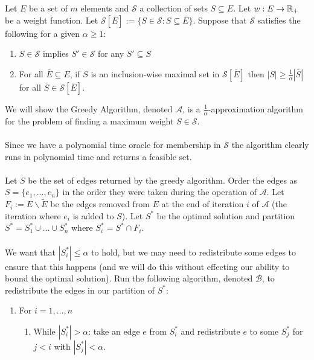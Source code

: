 \documentclass[letterpaper,12pt,oneside,onecolumn]{article}
\newcommand{\cA}{\mathcal{A}} \newcommand{\cB}{\mathcal{B}}
\newcommand{\cS}{\mathcal{S}} \newcommand{\cT}{\mathcal{T}}
\begin{document}
\section{}
\paragraph{}
Let $E$ be a set of $m$ elements and $\cS$ a collection of sets $S \subseteq E$. Let $w: E\rightarrow \mathbb{R}_+$ be a weight function. Let $\cS[\bar{E}] := \{ S \in \cS : S \subseteq \bar{E}\}$. Suppose that $\cS$ satisfies the following for a given $\alpha \geq 1$:
\begin{enumerate}
\item $S \in \cS$ implies $S' \in \cS$ for any $S' \subseteq S$
\item For all $\bar{E} \subseteq E$, if $S$ is an inclusion-wise maximal set in $\cS[\bar{E}]$ then $|S| \geq \frac{1}{\alpha} |\bar{S}|$ for all $\bar{S} \in \cS[\bar{E}]$.
\end{enumerate}
We will show the Greedy Algorithm, denoted $\cA$, is a $\frac{1}{\alpha}$-approximation algorithm for the problem of finding a maximum weight $S \in \cS$.
\paragraph{}
Since we have a polynomial time oracle for membership in $\cS$ the algorithm clearly runs in polynomial time and returns a feasible set.
\paragraph{}
Let $S$ be the set of edges returned by the greedy algorithm. Order the edges as $S = \{e_1, \dots, e_n\}$ in the order they were taken during the operation of $\cA$. Let $F_i := E\backslash \tilde{E}$ be the edges removed from $E$ at the end of iteration $i$ of $\cA$ (the iteration where $e_i$ is added to $S$). Let $S^*$ be the optimal solution and partition $S^* = S^*_1 \cup \dots \cup S^*_n$ where $S^*_i = S^* \cap F_i$.
\paragraph{}
We want that $|S^*_i| \leq \alpha$ to hold, but we may need to redistribute some edges to ensure that this happens (and we will do this without effecting our ability to bound the optimal solution). Run the following algorithm, denoted $\cB$, to redistribute the edges in our partition of $S^*$:
\begin{enumerate}
\item For $i = 1, \dots, n$
\begin{enumerate}
\item While $|S^*_i| > \alpha$: take an edge $e$ from $S^*_i$ and redistribute $e$ to some $S^*_j$ for $j<i$ with $|S^*_j| < \alpha$.
\end{enumerate}
\end{enumerate}
\end{document}
